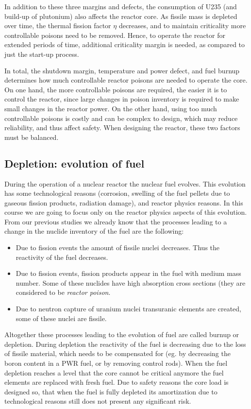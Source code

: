 In addition to these three margins and defects, the consumption of U235 (and build-up of plutonium) also affects the reactor core. As fissile mass is depleted over time, the thermal fission factor $\eta$ decreases, and to maintain criticality more controllable poisons need to be removed. Hence, to operate the reactor for extended periods of time, additional criticality margin is needed, as compared to just the start-up process.

In total, the shutdown margin, temperature and power defect, and fuel burnup determines how much controllable reactor poisons are needed to operate the core. On one hand, the more controllable poisons are required, the easier it is to control the reactor, since large changes in poison inventory is required to make small changes in the reactor power. On the other hand, using too much controllable poisons is costly and can be complex to design, which may reduce reliability, and thus affect safety. When designing the reactor, these two factors must be balanced.


\subsection{Depletion: evolution of fuel}

During the operation of a nuclear reactor the nuclear fuel evolves. This evolution has some technological reasons (corrosion, swelling of the fuel pellets due to gaseous fission products, radiation damage), and reactor physics reasons. In this course we are going to focus only on the reactor physics aspects of this evolution. From our previous studies we already know that the processes leading to a change in the nuclide inventory of the fuel are the following:

\begin{itemize}
\item Due to fission events the amount of fissile nuclei decreases. Thus the reactivity of the fuel decreases.
\item Due to fission events, fission products appear in the fuel with medium mass number. Some of these nuclides have high absorption cross sections (they are considered to be \textit{reactor poison}.
\item Due to neutron capture of uranium nuclei transuranic elements are created, some of these nuclei are fissile.
\end{itemize}

Altogether these processes leading to the evolution of fuel are called burnup or depletion. During depletion the reactivity of the fuel is decreasing due to the loss of fissile material, which needs to be compensated for (eg. by decreasing the boron content in a PWR fuel, or by removing control rods). When the fuel depletion reaches a level that the core cannot be critical anymore the fuel elements are replaced with fresh fuel. Due to safety reasons the core load is designed so, that when the fuel is fully depleted its amortization due to technological reasons still does not present any significant risk.

